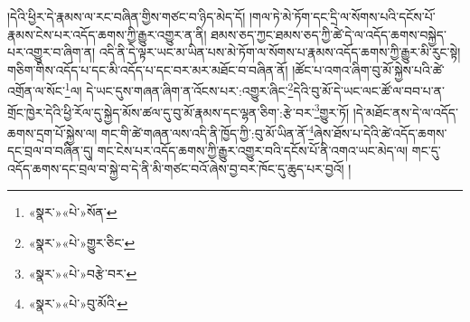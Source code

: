 །དེའི་ཕྱིར་དེ་རྣམས་ལ་རང་བཞིན་གྱིས་གཙང་བ་ཉིད་མེད་དོ། །གལ་ཏེ་མེ་ཏོག་དང་དྲི་ལ་སོགས་པའི་དངོས་པོ་རྣམས་ངེས་པར་འདོད་ཆགས་ཀྱི་རྒྱུར་འགྱུར་ན་ནི། ཐམས་ཅད་ཀྱང་ཐམས་ཅད་ཀྱི་ཚེ་དེ་ལ་འདོད་ཆགས་བསྐྱེད་པར་འགྱུར་བ་ཞིག་ན། འདི་ནི་དེ་ལྟར་ཡང་མ་ཡིན་པས་མེ་ཏོག་ལ་སོགས་པ་རྣམས་འདོད་ཆགས་ཀྱི་རྒྱུར་མི་རུང་སྟེ། གཅིག་གིས་འདོད་པ་དང་མི་འདོད་པ་དང་བར་མར་མཐོང་བ་བཞིན་ནོ། །ཚོང་པ་འགའ་ཞིག་བུ་མོ་སྐྱེས་པའི་ཚེ་འགྲོན་ལ་སོང་\footnote{«སྣར་»«པེ་»སོན་}ལ། དེ་ཡང་དུས་གཞན་ཞིག་ན་འོངས་པར་:འགྱུར་ཞིང་\footnote{«སྣར་»«པེ་»གྱུར་ཅིང་}དེའི་བུ་མོ་དེ་ཡང་ལང་ཚོ་ལ་བབ་པ་ན་གྲོང་ཁྱེར་དེའི་ཕྱི་རོལ་དུ་སྐྱེད་མོས་ཚལ་དུ་བུ་མོ་རྣམས་དང་ལྷན་ཅིག་:རྩེ་བར་\footnote{«སྣར་»«པེ་»བརྩེ་བར་}གྱུར་ཏོ། །དེ་མཐོང་ནས་དེ་ལ་འདོད་ཆགས་དྲག་པོ་སྐྱེས་ལ། གང་གི་ཚེ་གཞན་ལས་འདི་ནི་ཁྱོད་ཀྱི་:བུ་མོ་ཡིན་ནོ་\footnote{«སྣར་»«པེ་»བུ་མོའི་}ཞེས་ཐོས་པ་དེའི་ཚེ་འདོད་ཆགས་དང་བྲལ་བ་བཞིན་དུ། གང་ངེས་པར་འདོད་ཆགས་ཀྱི་རྒྱུར་འགྱུར་བའི་དངོས་པོ་ནི་འགའ་ཡང་མེད་ལ། གང་དུ་འདོད་ཆགས་དང་བྲལ་བ་སྐྱེ་བ་དེ་ནི་མི་གཙང་བའོ་ཞེས་བྱ་བར་ཁོང་དུ་ཆུད་པར་བྱའོ། །
